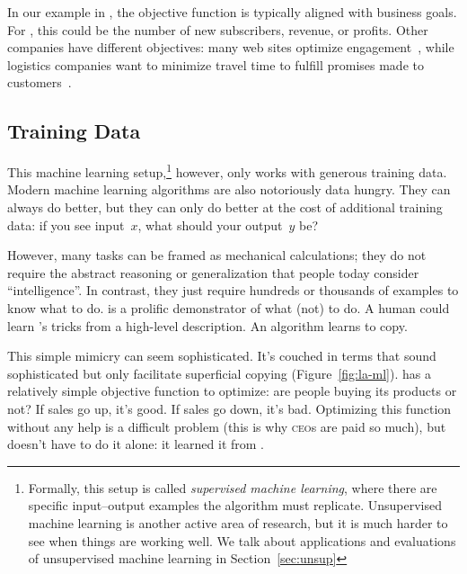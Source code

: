 In our example in \crunchyCity{}, the objective function is typically
aligned with business goals.
%
For \energyCompany{}, this could be the number of new subscribers,
revenue, or profits.
%
Other companies have different objectives: many web sites optimize
engagement~\citep{hoiles-17}, while logistics companies want to
minimize travel time to fulfill promises made to customers~\citep{fiat-16}.

\subsection{Training Data}

This machine learning setup,\footnote{Formally, this setup is called
  \emph{supervised machine learning}, where there are specific
  input--output examples the algorithm must replicate.  Unsupervised
  machine learning is another active area of research, but it is much
  harder to see when things are working well.  We talk about
  applications and evaluations of unsupervised machine learning in
  Section~\ref{sec:unsup}} however, only works with generous training
data.  Modern machine learning algorithms are also notoriously data
hungry.  They can always do better, but they can only do better at the
cost of additional training data: if you see input~$x$, what should
your output~$y$ be?

However, many tasks can be framed as mechanical calculations; they
do not require the abstract reasoning or generalization that people today
consider ``intelligence''.  In contrast, they just require hundreds
or thousands of examples to know what to do.  \energyJerk{} is a
prolific demonstrator of what (not) to do.  A human could learn
\energyJerk{}'s tricks from a high-level description.  An algorithm
learns to copy. 

This simple mimicry can seem sophisticated.  It's couched in terms
that sound sophisticated but only facilitate superficial copying
(Figure~\ref{fig:la-ml}).  \energyCompany{} has a relatively simple
objective function to optimize: are people buying its
products or not?  If sales go up, it's good.  If sales go down, it's
bad.  Optimizing this function without any help is a difficult problem
(this is why \textsc{ceo}s are paid so much), but \energyCompany{}
doesn't have to do it alone: it learned it from \energyJerk{}.

